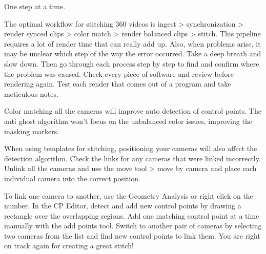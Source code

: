 \begin{fullwidth}

{\large One step at a time. \par}

The optimal workflow for stitching 360 videos is ingest > synchronization > render synced clips > color match > render balanced clips > stitch. This pipeline requires a lot of render time that can really add up. Also, when problems arise, it may be unclear which step of the way the error occurred. Take a deep breath and slow down. Then go through each process step by step to find and confirm where the problem was caused. Check every piece of software and review before rendering again. Test each render that comes out of a program and take meticulous notes. 

Color matching all the cameras will improve auto detection of control points. The anti ghost algorithm won’t focus on the unbalanced color issues, improving the masking markers. 


When using templates for stitching, positioning your cameras will also affect the detection algorithm. Check the links for any cameras that were linked incorrectly. Unlink all the cameras and use the move tool > move by camera and place each individual camera into the correct position.


\clearpage
To link one camera to another, use the Geometry Analysis or right click on the number. In the CP Editor, detect and add new control points by drawing a rectangle over the overlapping regions. Add one matching control point at a time manually with the add points tool. Switch to another pair of cameras by selecting two cameras from the list and find new control points to link them. You are right on track again for creating a great stitch!



\clearpage
\end{fullwidth}